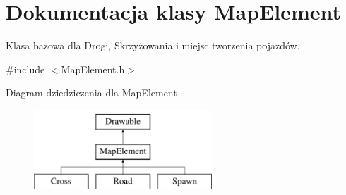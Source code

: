 \hypertarget{class_map_element}{\section{Dokumentacja klasy Map\-Element}
\label{class_map_element}
}


Klasa bazowa dla Drogi, Skrzyżowania i miejsc tworzenia pojazdów.  




{\ttfamily \#include $<$Map\-Element.\-h$>$}

Diagram dziedziczenia dla Map\-Element\begin{figure}[H]
\begin{center}
\leavevmode
\includegraphics[height=3.000000cm]{class_map_element}
\end{center}
\end{figure}
